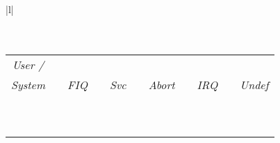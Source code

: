 \begin{tabular}{|l|}
\hline
\\
\\
\\
\ttfamily
\small
\begin{tabular}[b]{|l|c|l|c|l|c|l|c|l|c|l|}
	\multicolumn{1}{c}{\emph{User /}} \\
	\multicolumn{1}{c}{\emph{System}} & \multicolumn{1}{c}{} & \multicolumn{1}{c}{\emph{FIQ}} & \multicolumn{1}{c}{} & \multicolumn{1}{c}{\emph{Svc}} & \multicolumn{1}{c}{} & \multicolumn{1}{c}{\emph{Abort}} & \multicolumn{1}{c}{} & \multicolumn{1}{c}{\emph{IRQ}} & \multicolumn{1}{c}{} &\multicolumn{1}{c}{\emph{Undef}} \\
	\hhline{-*{5}{~-}}
	\register{R0} & & \register{R0} & & \register{R0} & & \register{R0} & & \register{R0} & & \register{R0}\\
	\hhline{-*{5}{~-}}
	\register{R1} & & \register{R1} & & \register{R1} & & \register{R1} & & \register{R1} & & \register{R1}\\
	\hhline{-*{5}{~-}}
	\register{R2} & & \register{R2} & & \register{R2} & & \register{R2} & & \register{R2} & & \register{R2}\\
	\hhline{-*{5}{~-}}
	\register{R3} & & \register{R3} & & \register{R3} & & \register{R3} & & \register{R3} & & \register{R3}\\
	\hhline{-*{5}{~-}}
	\register{R4} & & \register{R4} & & \register{R4} & & \register{R4} & & \register{R4} & & \register{R4}\\
	\hhline{-*{5}{~-}}
	\register{R5} & & \register{R5} & & \register{R5} & & \register{R5} & & \register{R5} & & \register{R5}\\
	\hhline{-*{5}{~-}}
	\register{R6} & & \register{R6} & & \register{R6} & & \register{R6} & & \register{R6} & & \register{R6}\\
	\hhline{-*{5}{~-}}
	\register{R7} & & \register{R7} & & \register{R7} & & \register{R7} & & \register{R7} & & \register{R7}\\
	\hhline{-*{5}{~-}}
	\register{SP} & & \cellcolor{gray!25}\register{SP\_fiq} & & \cellcolor{gray!25}\register{SP\_svc} & & \cellcolor{gray!25}\register{SP\_abt} & & \cellcolor{gray!25}\register{SP\_irq} & & \cellcolor{gray!25}\register{SP\_und} \\
	\hhline{-*{5}{~-}}
	\register{LR} & & \cellcolor{gray!25}\register{LR\_fiq} & & \cellcolor{gray!25}\register{LR\_svc} & & \cellcolor{gray!25}\register{LR\_abt} & & \cellcolor{gray!25}\register{LR\_irq} & & \cellcolor{gray!25}\register{LR\_und} \\

\end{tabular}
\end{tabular}
